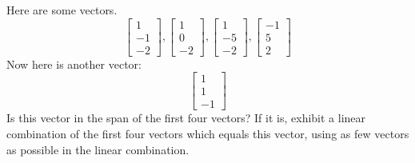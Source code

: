 \documentclass{ximera}
\begin{document}
\begin{problem}\label{prb:3.11} Here are some vectors.
\begin{equation*}
\left[
\begin{array}{r}
1 \\
-1 \\
-2
\end{array}
\right] ,\left[
\begin{array}{r}
1 \\
0 \\
-2
\end{array}
\right] ,\left[
\begin{array}{r}
1 \\
-5 \\
-2
\end{array}
\right] ,\left[
\begin{array}{r}
-1 \\
5 \\
2
\end{array}
\right]
\end{equation*}
Now here is another vector:\
\begin{equation*}
\left[
\begin{array}{r}
1 \\
1 \\
-1
\end{array}
\right]
\end{equation*}
Is this vector in the span of the first four vectors? If it is, exhibit a
linear combination of the first four vectors which equals this vector, using
as few vectors as possible in the linear combination.
\end{problem}
\end{document}
